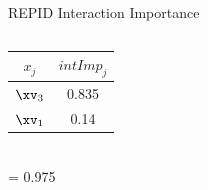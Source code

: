 \documentclass[11pt,compress,t,notes=noshow, aspectratio=169, xcolor=table,dvipsnames]{beamer}
\begin{document}
\begin{frame}{REPID Interaction Importance}
\begin{columns}[T, totalwidth=\textwidth]
\begin{column}{0.52\textwidth}
 \vspace{-200px}
    \scriptsize
 \hspace{130px}
 \setlength{\tabcolsep}{1pt}
 \begin{tabular}{|c|c|}
    \hline
       $x_j$ & $intImp_j$  \\\hline
       \rowcolor{ForestGreen!70}
        $\xv_3$     & 0.835 \\
        \rowcolor{YellowGreen!50}
        $\xv_1$     &  0.14\\\hline
    \end{tabular}\\
 \hspace{138px}= 0.975

    \end{column}
\end{columns}

\end{frame}
\end{document}
